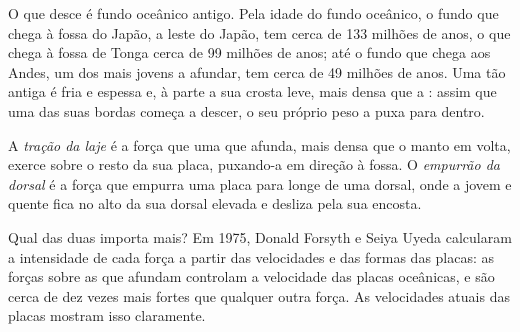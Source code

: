 O que desce é fundo oceânico antigo. Pela idade do fundo oceânico, o fundo
que chega à fossa do Japão, a leste do Japão, tem cerca de 133 milhões de
anos, o que chega à fossa de Tonga cerca de 99 milhões de anos; até o fundo
que chega aos Andes, um dos mais jovens a afundar, tem cerca de 49 milhões
de anos. Uma  tão antiga é fria e espessa e, à parte a sua crosta
leve, mais densa que a : assim que uma das suas bordas começa a
descer, o seu próprio peso a puxa para dentro.

\begin{definition}\label{def:g11:subduction-zones:slab-pull}
A \emph{tração da laje} é a força que
uma  que afunda, mais densa que o manto em volta, exerce sobre o resto da
sua placa, puxando-a em direção à fossa. O \emph{empurrão da
dorsal} é a força que empurra
uma placa para longe de uma dorsal, onde a  jovem e quente fica no
alto da sua dorsal elevada e desliza pela sua encosta.
\end{definition}

Qual das duas importa mais? Em 1975, Donald Forsyth e Seiya Uyeda
calcularam a intensidade de cada força a partir das velocidades e das formas
das placas: as forças sobre as  que afundam controlam a velocidade das
placas oceânicas, e são cerca de dez vezes mais fortes que qualquer outra
força. As velocidades atuais das placas mostram isso claramente.


